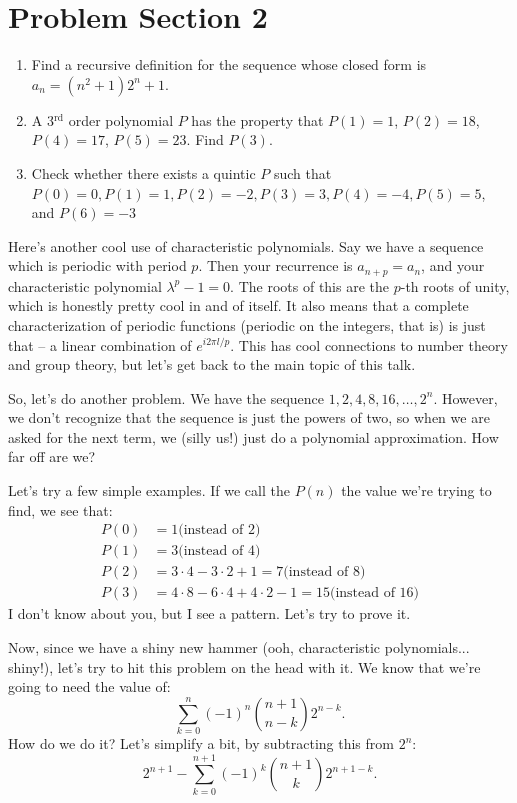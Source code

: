 \documentclass[12pt,letterpaper]{article}
\begin{document}
\section{Problem Section 2}
\begin{enumerate}
  \item Find a recursive definition for the sequence whose closed form is $a_n =
  (n^2 + 1) 2^n + 1$.
  \item A 3$^{\text{rd}}$ order polynomial $P$ has the property that $P(1) = 1$, $P(2) = 18$,
  $P(4) = 17$, $P(5) = 23$. Find $P(3)$.
  \item Check whether there exists a quintic $P$ such that $P(0) = 0, P(1) = 1, P(2) = -2,
  P(3) = 3, P(4) = -4, P(5) = 5$, and $P(6)=-3$
\end{enumerate}

Here's another cool use of characteristic polynomials. Say we have a
sequence which is periodic with period $p$. Then your recurrence is
$a_{n+p} = a_n$, and your characteristic polynomial $\lambda^p-1=0$.
The roots of this are the $p$-th roots of unity, which is honestly
pretty cool in and of itself. It also means that a complete
characterization of periodic functions (periodic on the integers, that
is) is just that -- a linear combination of $e^{i2\pi l/p}$. This has
cool connections to number theory and group theory, but let's get back
to the main topic of this talk.

So, let's do another problem. We have the sequence $1, 2, 4, 8, 16, \ldots, 2^n$. However,
we don't recognize that the sequence is just the powers of two, so when we are
asked for the next term, we (silly us!) just do a polynomial approximation. How
far off are we?

Let's try a few simple examples. If we call the $P(n)$ the value we're trying to find, we
see that:
\begin{eqnarray*}
P(0) &= 1 \text{(instead of 2)}\\
P(1) &= 3 \text{(instead of 4)}\\
P(2) &= 3\cdot4-3\cdot2+1 = 7 \text{(instead of 8)}\\
P(3) &= 4\cdot8-6\cdot4+4\cdot2-1 = 15 \text{(instead of 16)}
\end{eqnarray*}
I don't know about you, but I see a pattern. Let's try to prove it.

Now, since we have a shiny new hammer (ooh, characteristic polynomials... shiny!), let's try
to hit this problem on the head with it. We know that we're going to need the value of: $$
\sum_{k=0}^{n} (-1)^n \binom{n+1}{n-k} 2^{n-k}.$$ How do we do it? Let's simplify a bit, by
subtracting this from $2^n$: $$2^{n+1} - \sum_{k=0}^{n+1} (-1)^k \binom{n+1}{k} 2^{n+1-k}.$$
\end{document}
